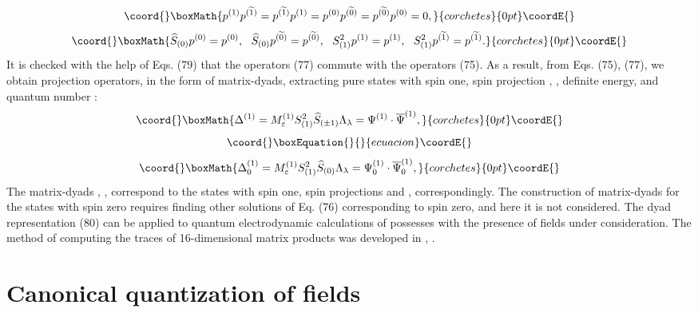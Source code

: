 \documentclass[a4paper,12pt]{article}
\begin{document}
\vspace{-7mm}
\[\coord{}\boxMath{
 p^{(1)}p^{(\widetilde{1})}=p^{(\widetilde{1})}p^{(1)}
=p^{(0)}p^{(\widetilde{0})}=p^{(\widetilde{0})}p^{(0)}=0 ,
}{corchetes}{0pt}\coordE{}\]
\[\coord{}\boxMath{
\widehat{S}_{(0)}p^{( 0)}=p^{( 0)}
,~~\widehat{S}_{(0)}p^{(\widetilde{0})}=p^{(\widetilde{0})} ,~~
S_{(1)}^2 p^{(1)}=p^{(1)}
,~~S^2_{(1)}p^{(\widetilde{1})}=p^{(\widetilde{1})} .
}{corchetes}{0pt}\coordE{}\]
It is checked with the help of Eqs. (79) that the operators (77)
commute with the operators (75). As a result, from Eqs. (75),
(77), we obtain projection operators, in the form of matrix-dyads,
extracting pure states with spin one, spin projection \coordHE{},
\coordHE{}, definite energy, and quantum number \coordHE{}:
\[\coord{}\boxMath{
\Delta ^{(1)}=M^{(1)}_\varepsilon S_{(1)}^2 \widehat{ S}_{(\pm
1)}\Lambda _\lambda = \Psi ^{(1)}\cdot \overline{ \Psi }^{(1)} ,
}{corchetes}{0pt}\coordE{}\]
\vspace{-7mm}
\begin{equation}\coord{}\boxEquation{
\label{80}
}{
}{ecuacion}\coordE{}\end{equation}
\vspace{-7mm}
\[\coord{}\boxMath{
\Delta _0^{(1)}=M^{(1)}_\varepsilon S_{(1)}^2 \widehat{
S}_{(0)}\Lambda _\lambda =\Psi _0^{(1)}\cdot \overline{\Psi
}_0^{(1)} ,
}{corchetes}{0pt}\coordE{}\]
 The matrix-dyads \coordHE{}, \coordHE{}, correspond to the states with spin one, spin
projections \coordHE{} and \coordHE{}, correspondingly. The construction of
matrix-dyads for the states with spin zero requires finding other
solutions of Eq. (76) corresponding to spin zero, and here it is
not considered. The dyad representation (80) can be applied to
quantum electrodynamic calculations of possesses with the presence
of fields under consideration. The method of computing the traces
of 16-dimensional matrix products was developed in
\cite{Kruglov1}, \cite{monogr}.

\section{Canonical quantization of fields}
\end{document}
